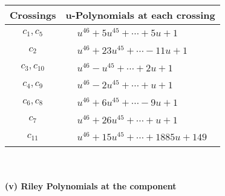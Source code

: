 \documentclass[1p]{elsarticle_modified}
\theoremstyle{definition}
\begin{document}
\begin{tabular}{m{50pt}|m{274pt}}
Crossings & \hspace{64pt}u-Polynomials at each crossing \\
\hline $$\begin{aligned}c_{1},c_{5}\end{aligned}$$&$\begin{aligned}
&u^{46}+5 u^{45}+\cdots+5 u+1
\end{aligned}$\\
\hline $$\begin{aligned}c_{2}\end{aligned}$$&$\begin{aligned}
&u^{46}+23 u^{45}+\cdots-11 u+1
\end{aligned}$\\
\hline $$\begin{aligned}c_{3},c_{10}\end{aligned}$$&$\begin{aligned}
&u^{46}- u^{45}+\cdots+2 u+1
\end{aligned}$\\
\hline $$\begin{aligned}c_{4},c_{9}\end{aligned}$$&$\begin{aligned}
&u^{46}-2 u^{45}+\cdots+u+1
\end{aligned}$\\
\hline $$\begin{aligned}c_{6},c_{8}\end{aligned}$$&$\begin{aligned}
&u^{46}+6 u^{45}+\cdots-9 u+1
\end{aligned}$\\
\hline $$\begin{aligned}c_{7}\end{aligned}$$&$\begin{aligned}
&u^{46}+26 u^{45}+\cdots+u+1
\end{aligned}$\\
\hline $$\begin{aligned}c_{11}\end{aligned}$$&$\begin{aligned}
&u^{46}+15 u^{45}+\cdots+1885 u+149
\end{aligned}$\\
\hline
\end{tabular}\\~\\
\newpage\renewcommand{\arraystretch}{1}
\flushleft \textbf{(v) Riley Polynomials at the component}\newline \\
\end{document}
